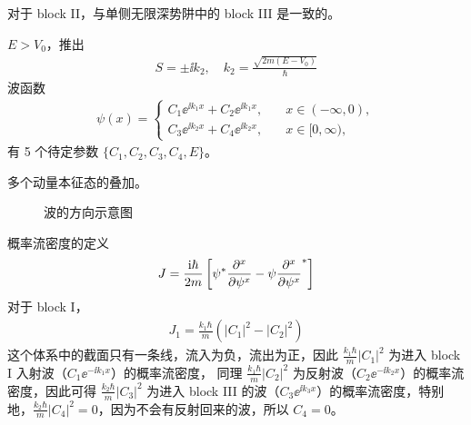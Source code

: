 对于 block II，与单侧无限深势阱中的 block III 是一致的。

 $E > V_0$，推出
\begin{eqnarray}
    S = \pm \ii k_2, \quad k_2 = \frac{\sqrt{2m(E-V_0)}}{\hbar}
\end{eqnarray}
波函数
\begin{align}
    \psi(x) = \begin{cases}
        C_1 \ee^{\ii k_1 x} + C_2 \ee^{\ii k_1 x},\quad & x \in (-\infty, 0), \\
        C_3 \ee^{\ii k_2 x} + C_4 \ee^{\ii k_2 x}, \quad & x \in [0, \infty),
    \end{cases}
\end{align}
有 5 个待定参数 $\{C_1, C_2, C_3, C_4, E\}$。

多个动量本征态的叠加。
\begin{figure}[tp]\centering
    \caption{波的方向示意图}
\end{figure}

概率流密度的定义
\begin{eqnarray}
    J = \frac{\mathrm{i}\hbar}{2m} \left[
        \psi^* \pdv[x] \psi - \psi \pdv[x] \psi^*
    \right]
\end{eqnarray}
对于 block I，
\begin{eqnarray}
    J_1 = \frac{k_1 \hbar}{m} \left(
        |C_1|^2 - |C_2|^2
    \right)
\end{eqnarray}
这个体系中的截面只有一条线，流入为负，流出为正，因此
$\frac{k_1 \hbar}{m} |C_1|^2$ 为进入 block I 入射波（$C_1 \ee^{-\ii k_1 x}$）的概率流密度，
同理 $\frac{k_1 \hbar}{m} |C_2|^2$ 为反射波（$C_2 \ee^{-\ii k_2 x}$）的概率流密度，因此可得 $\frac{k_2 \hbar}{m} |C_3|^2$ 为进入 block III 的波（$C_3 \ee^{\ii k_3 x}$）的概率流密度，特别地，$\frac{k_2 \hbar}{m} |C_4|^2 = 0$，因为不会有反射回来的波，所以 $C_4 = 0$。

